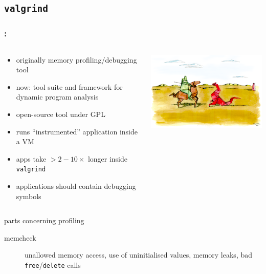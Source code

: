 \documentclass[9pt,xcolor=table]{beamer}
\begin{document}
\subsection{\texttt{valgrind}}
\begin{frame}
\frametitle{\insertsectionhead{}: \insertsubsectionhead{}}
  \begin{columns}[t]
    \begin{column}{.58\textwidth}
      \begin{itemize}
      \item originally memory profiling/debugging tool
      \item now: tool suite and framework for dynamic program analysis
      \item open-source tool under GPL
      \item runs ``instrumented'' application inside a VM
      \item apps take $>2-10\times$ longer inside \texttt{valgrind}
      \item applications should contain debugging symbols
      \end{itemize}
    \end{column}
    \begin{column}{.4\textwidth}
      \begin{center}
      \includegraphics[width=\textwidth]{img/Valgrind_logo}
    \end{center}
    \end{column}
  \end{columns}
  \pause
  \begin{block}{parts concerning profiling}
    \begin{description}
    \item[memcheck] unallowed memory access, use of uninitialised values, memory leaks, bad \texttt{free}/\texttt{delete} calls

\end{description}
\end{block}
\end{frame}
\end{document}

